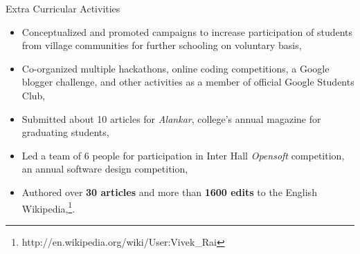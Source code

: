 \documentclass{article}
\newlength{\tabin}
\newlength{\secsep}
\newcommand{\lineunder}{\vspace*{-8pt} \\ \hspace*{-6pt} \hrulefill \\ \vspace*{-15pt}}
\newenvironment{tabbedsection}[1]{
  \begin{list}{}{
      \setlength{\itemsep}{0pt}
      \setlength{\labelsep}{0pt}
      \setlength{\labelwidth}{0pt}
      \setlength{\leftmargin}{\tabin}
      \setlength{\rightmargin}{\tabin}
      \setlength{\listparindent}{0pt}
      \setlength{\parsep}{0pt}
      \setlength{\parskip}{0pt}
      \setlength{\partopsep}{0pt}
      \setlength{\topsep}{#1}
    }
  \item[]
}{\end{list}}
\newenvironment{resume_section}[1]{
  \filbreak
  \vspace{2\secsep}
  \textsc{\large#1}
  \lineunder
  \begin{tabbedsection}{\secsep}
}{\end{tabbedsection}}
\newenvironment{subitems}{
  \renewcommand{\labelitemi}{$\cdot$}
  \begin{itemize}
      \setlength{\labelsep}{1em}
}{\end{itemize}}
\begin{document}
\begin{resume_section}{Extra Curricular Activities}
    \begin{subitems}
    \item Conceptualized and promoted campaigns to increase participation of students from village communities for further schooling on voluntary basis,
      \item Co-organized multiple hackathons, online coding competitions, a Google blogger challenge, and other activities as a member of official Google Students Club,
      \item Submitted about 10 articles for \emph{Alankar}, college's annual magazine for graduating students,
      \item Led a team of 6 people for participation in Inter Hall \emph{Opensoft} competition, an annual software design competition,
      \item Authored over \textbf{30 articles} and more than \textbf{1600 edits} to the English Wikipedia,\footnote{http://en.wikipedia.org/wiki/User:Vivek\_Rai}.
    \end{subitems}
\end{resume_section}
\end{document}
